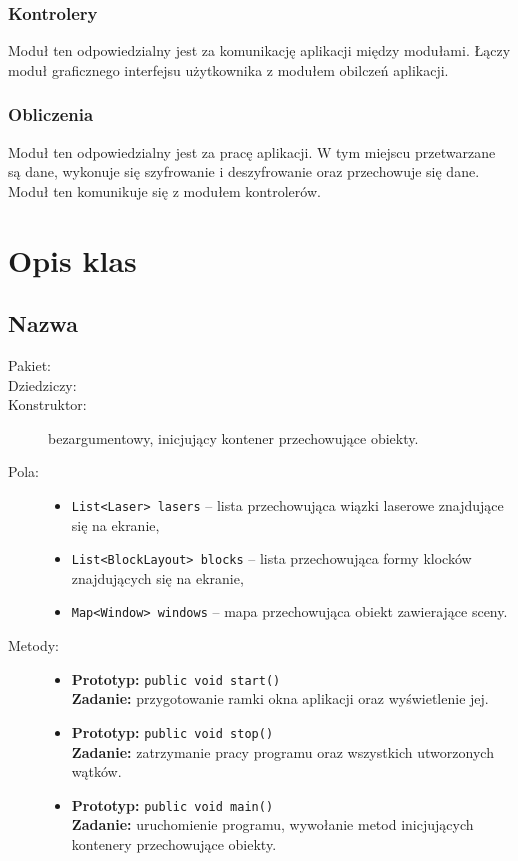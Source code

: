 \documentclass[a4paper]{article}
\newcommand{\prog}{\texttt}
\begin{document}
\subsubsection{Kontrolery}
Moduł ten odpowiedzialny jest za komunikację aplikacji między modułami. Łączy moduł graficznego interfejsu użytkownika z modułem obilczeń aplikacji.

\subsubsection{Obliczenia}
Moduł ten odpowiedzialny jest za pracę aplikacji. W tym miejscu przetwarzane są dane, wykonuje się szyfrowanie i deszyfrowanie oraz przechowuje się dane. Moduł ten komunikuje się z modułem kontrolerów.

\section{Opis klas}
\subsection{Nazwa}
\begin{description}
    \item[Pakiet:]
    \item[Dziedziczy:]
    \item[Konstruktor:] bezargumentowy, inicjujący kontener przechowujące obiekty.
    \item[Pola:] \hfill
    \begin{itemize}
        \item \prog{List<Laser> lasers} -- lista przechowująca wiązki laserowe znajdujące się na ekranie,
        \item \prog{List<BlockLayout> blocks} -- lista przechowująca formy klocków znajdujących się na ekranie,
        \item \prog{Map<Window> windows} -- mapa przechowująca obiekt zawierające sceny.
    \end{itemize}
    \item[Metody:] \hfill
    \begin{itemize}
        \item \textbf{Prototyp:} \prog{public void start()}\\\textbf{Zadanie:} przygotowanie ramki okna aplikacji oraz wyświetlenie jej.
        \item \textbf{Prototyp:} \prog{public void stop()}\\\textbf{Zadanie:} zatrzymanie pracy programu oraz wszystkich utworzonych wątków.
        \item \textbf{Prototyp:} \prog{public void main()}\\\textbf{Zadanie:} uruchomienie programu, wywołanie metod inicjujących kontenery przechowujące obiekty.
    \end{itemize}
\end{description}
\end{document}
